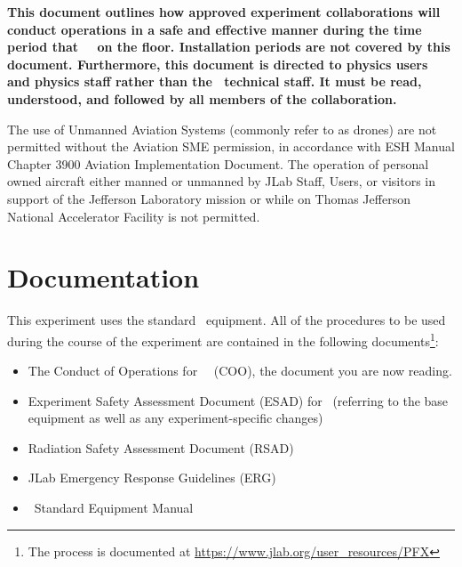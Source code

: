 \documentclass[10pt]{article}
\begin{document}
{\bf This document outlines how approved experiment collaborations will conduct
operations in a safe and effective manner during the time period that
\EXPTS\ \BETENSE\ on the floor. Installation
periods are not covered by this document.
Furthermore, this document is directed to physics users and
physics staff rather than the \HALL\ technical staff.  It must be read,
understood, and followed by all members of the collaboration. }

The use of Unmanned Aviation Systems (commonly refer to as drones) are
not permitted without the Aviation SME permission, in accordance with
ESH Manual Chapter 3900 Aviation Implementation Document. The
operation of personal owned aircraft either manned or unmanned by JLab
Staff, Users, or visitors in support of the Jefferson Laboratory
mission or while on Thomas Jefferson National Accelerator Facility is
not permitted.

\section{Documentation}

This experiment uses the standard \HALL\ equipment.
All of the procedures to be used during the course of the experiment are contained in the following
documents\footnote{The process is documented at \url{https://www.jlab.org/user_resources/PFX} }:

\begin{itemize}

\item  The Conduct of Operations for \HALL\ \EXPTS\
 (COO), the document you are now reading.

\item   Experiment Safety Assessment Document (ESAD)
for \EXPTS\ (referring to the base equipment as well as any
experiment-specific changes)

\item Radiation Safety Assessment Document (RSAD)

\item JLab Emergency Response Guidelines (ERG)

\item \HALL\ Standard Equipment Manual

\end{itemize}

\end{document}
